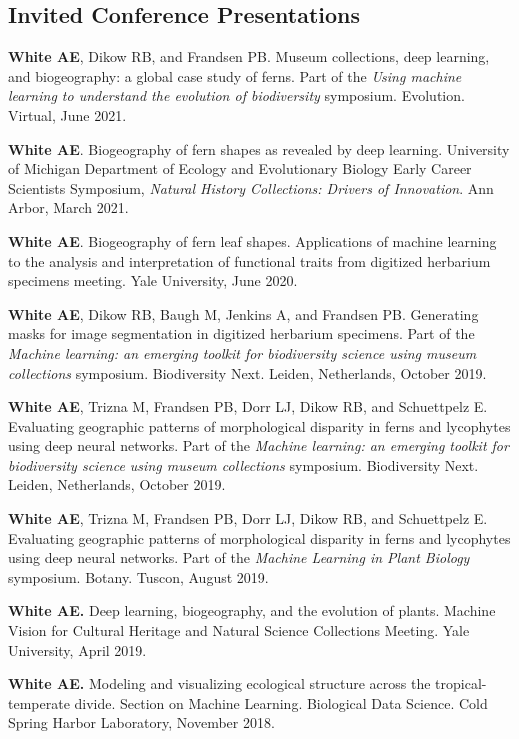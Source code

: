 \documentclass[letterpaper]{article}
\newenvironment{biblist}{%
   \begin{list}{}{%
     \setlength{\labelwidth}{0pt}%
     \setlength{\labelsep}{1em}%
     \setlength{\leftmargin}{2em}%
     \setlength{\itemindent}{-1em}%
   }
}{\end{list}}
\begin{document}
\subsection*{Invited Conference Presentations}
\begin{biblist}
\item \textbf{White AE}, Dikow RB, and Frandsen PB. Museum collections, deep learning, and biogeography: a global case study of ferns. Part of the \textit{Using machine learning to understand the evolution of biodiversity} symposium. Evolution. Virtual, June 2021.

\item \textbf{White AE}. Biogeography of fern shapes as revealed by deep learning. University of Michigan Department of Ecology and Evolutionary Biology Early Career Scientists Symposium, \textit{Natural History Collections: Drivers of Innovation}. Ann Arbor, March 2021.

\item \textbf{White AE}. Biogeography of fern leaf shapes. Applications of machine learning to the analysis and interpretation of functional traits from digitized herbarium specimens meeting. Yale University, June 2020.

\item \textbf{White AE}, Dikow RB, Baugh M, Jenkins A, and Frandsen PB. Generating masks for image segmentation in digitized herbarium specimens. Part of the \textit{Machine learning: an emerging toolkit for biodiversity science using museum collections} symposium. Biodiversity Next. Leiden, Netherlands, October 2019.

\item \textbf{White AE}, Trizna M, Frandsen PB, Dorr LJ, Dikow RB, and Schuettpelz E. Evaluating geographic patterns of morphological disparity in ferns and lycophytes using deep neural networks. Part of the \textit{Machine learning: an emerging toolkit for biodiversity science using museum collections} symposium. Biodiversity Next. Leiden, Netherlands, October 2019.

\item \textbf{White AE}, Trizna M, Frandsen PB, Dorr LJ, Dikow RB, and Schuettpelz E. Evaluating geographic patterns of morphological disparity in ferns and lycophytes using deep neural networks. Part of the \textit{Machine Learning in Plant Biology} symposium. Botany. Tuscon, August 2019.

\item \textbf{White AE.} Deep learning, biogeography, and the evolution of plants. Machine Vision for Cultural Heritage and Natural Science Collections Meeting. Yale University, April 2019.

\item \textbf{White AE.} Modeling and visualizing ecological structure across the tropical- temperate divide. Section on Machine Learning. Biological Data Science. Cold Spring Harbor Laboratory, November 2018.
\end{biblist}
\end{document}
